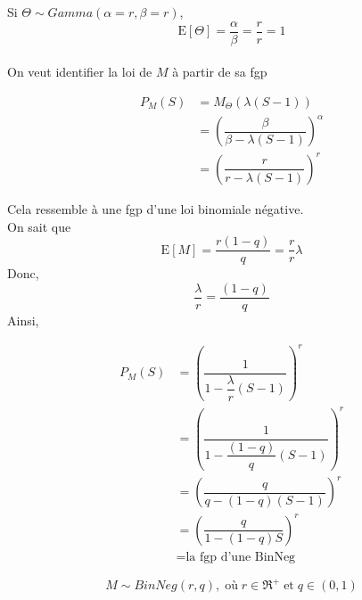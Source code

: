 Si \(\Theta \sim Gamma(\alpha=r,\beta=r)\), \[
\text{E}[\Theta]=\dfrac{\alpha}{\beta}=\dfrac{r}{r}=1
\]\\
On veut identifier la loi de \(M\) à partir de sa fgp

\begin{align*}
P_M(S)& =M_\Theta\left (\lambda(S-1)\right )\\
& =\left (\dfrac{\beta}{\beta-\lambda(S-1)}\right )^\alpha\\
& =\left (\dfrac{r}{r-\lambda(S-1)}\right )^r
\end{align*}

Cela ressemble à une fgp d'une loi binomiale négative.\\
On sait que \[
\text{E}[M]=\dfrac{r(1-q)}{q}=\dfrac{r}{r}\lambda
\] Donc, \[
\dfrac{\lambda}{r}=\dfrac{(1-q)}{q}
\] Ainsi,

\begin{align*}
P_M(S)& =\left (\dfrac{1}{1-\dfrac{\lambda}{r}(S-1)}\right )^r\\
& =\left (\dfrac{1}{1-\dfrac{(1-q)}{q}(S-1)}\right )^r\\
& =\left (\dfrac{q}{q-(1-q)(S-1)}\right )^r\\
& =\left (\dfrac{q}{1-(1-q)S}\right )^r\\
& =\text{la fgp d'une BinNeg}
\end{align*}

\[
M \sim BinNeg(r,q),\;\text{où}\;r \in \Re^+\;\text{et}\; q \in (0,1)
\]
